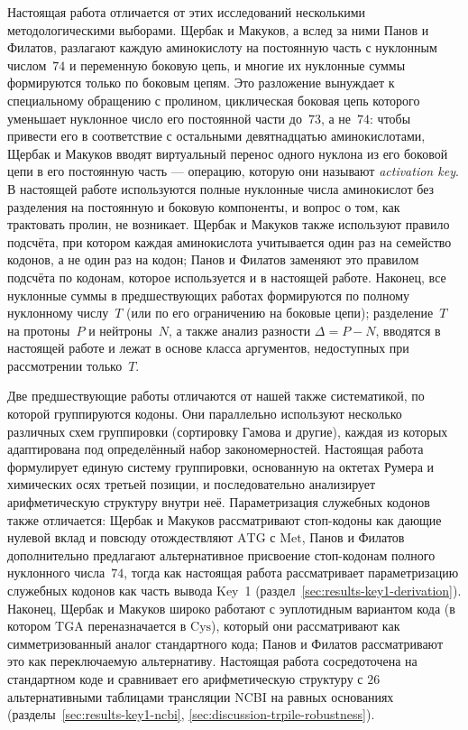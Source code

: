 \documentclass[11pt,a4paper]{article}
\renewcommand{\_}{\origunderscore\allowbreak}
\begin{document}
Настоящая работа отличается от этих исследований
несколькими методологическими выборами. Щербак и
Макуков, а вслед за ними Панов и Филатов,
разлагают каждую аминокислоту на постоянную часть с
нуклонным числом~$74$ и переменную боковую цепь, и
многие их нуклонные суммы формируются только по
боковым цепям. Это разложение вынуждает к специальному обращению с пролином,
циклическая боковая цепь которого уменьшает
нуклонное число его постоянной части до~$73$,
а не~$74$: чтобы привести
его в соответствие с остальными девятнадцатью
аминокислотами, Щербак и Макуков вводят виртуальный
перенос одного нуклона из его боковой цепи в его
постоянную часть — операцию, которую они называют
\emph{activation key}. В настоящей работе
используются полные нуклонные числа аминокислот без
разделения на постоянную и боковую компоненты, и
вопрос о том, как трактовать пролин, не возникает.
Щербак и Макуков также используют правило
подсчёта, при котором каждая аминокислота
учитывается один раз на семейство кодонов, а не
один раз на кодон; Панов и Филатов заменяют это
правилом подсчёта по кодонам, которое используется
и в настоящей работе. Наконец, все нуклонные суммы
в предшествующих работах формируются по полному
нуклонному числу~$T$ (или по его ограничению на
боковые цепи); разделение~$T$ на протоны~$P$ и
нейтроны~$N$, а также анализ разности
$\Delta = P - N$, вводятся в настоящей работе и
лежат в основе класса аргументов, недоступных при
рассмотрении только~$T$.

Две предшествующие работы отличаются от нашей также
систематикой, по которой группируются кодоны. Они
параллельно используют несколько различных схем
группировки (сортировку Гамова и другие), каждая из
которых адаптирована под определённый набор
закономерностей. Настоящая работа формулирует
единую систему группировки, основанную на октетах
Румера и химических осях третьей позиции, и
последовательно анализирует арифметическую
структуру внутри неё. Параметризация служебных
кодонов также отличается: Щербак и Макуков
рассматривают стоп-кодоны как дающие нулевой вклад
и повсюду отождествляют $\mathrm{ATG}$ с
$\mathrm{Met}$, Панов и Филатов дополнительно
предлагают альтернативное присвоение стоп-кодонам
полного нуклонного числа~$74$, тогда как настоящая
работа рассматривает параметризацию служебных
кодонов как часть вывода Key~1
(раздел~\ref{sec:results-key1-derivation}).
Наконец, Щербак и Макуков широко работают с
эуплотидным вариантом кода (в котором
$\mathrm{TGA}$ переназначается в $\mathrm{Cys}$),
который они рассматривают как симметризованный
аналог стандартного кода; Панов и Филатов
рассматривают это как переключаемую альтернативу.
Настоящая работа сосредоточена на стандартном коде
и сравнивает его арифметическую структуру с
$26$ альтернативными таблицами трансляции NCBI на
равных основаниях
(разделы~\ref{sec:results-key1-ncbi},
\ref{sec:discussion-trpile-robustness}).
\end{document}
